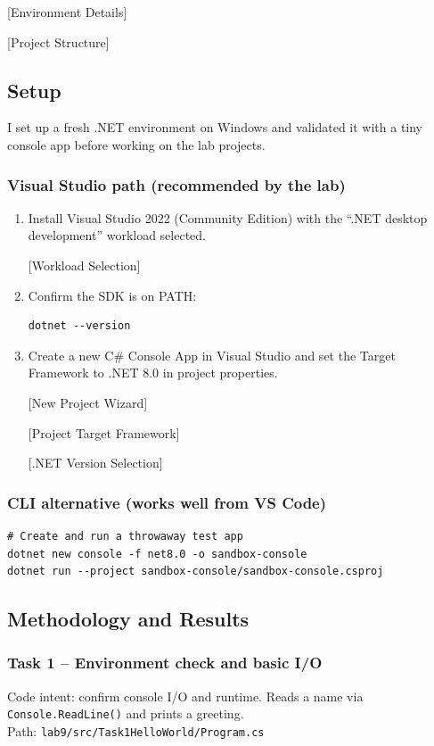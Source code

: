 [Environment Details]

[Project Structure]

\subsection{Setup}
I set up a fresh .NET environment on Windows and validated it with a tiny console app before working on the lab projects.

\subsubsection*{Visual Studio path (recommended by the lab)}
\begin{enumerate}
	\item Install Visual Studio 2022 (Community Edition) with the ``.NET desktop development'' workload selected.

[Workload Selection]

	\item Confirm the SDK is on PATH:
\begin{verbatim}
dotnet --version
\end{verbatim}
	\item Create a new C\# Console App in Visual Studio and set the Target Framework to .NET 8.0 in project properties.

[New Project Wizard]

[Project Target Framework]

[.NET Version Selection]
\end{enumerate}

\subsubsection*{CLI alternative (works well from VS Code)}
\begin{verbatim}
# Create and run a throwaway test app
dotnet new console -f net8.0 -o sandbox-console
dotnet run --project sandbox-console/sandbox-console.csproj
\end{verbatim}

\subsection{Methodology and Results}

\subsubsection{Task 1 -- Environment check and basic I/O}
Code intent: confirm console I/O and runtime. Reads a name via \texttt{Console.ReadLine()} and prints a greeting.\\
Path: \texttt{lab9/src/Task1HelloWorld/Program.cs}

